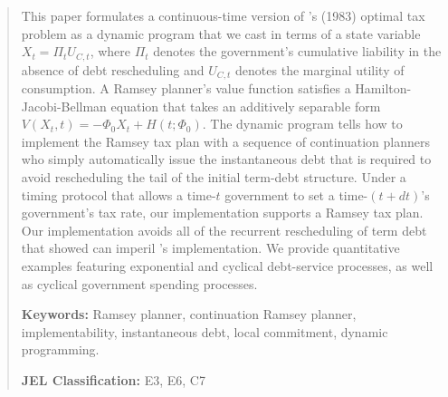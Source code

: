 \documentclass[12pt]{article}
\newcommand{\NW}[1]{{\textcolor{blue}{#1}}}
\newcommand{\TS}[1]{{\textcolor{magenta}{#1}}}
\begin{document}
	\begin{abstract}
		This paper formulates a  continuous-time version of \citeauthor{LucasStokey1983}'s (1983) optimal tax problem as   a dynamic program that we  cast in terms of a state variable $X_t = \Pi_t U_{C,t}$, where $\Pi_t$ denotes the government's cumulative liability {in the absence of debt rescheduling} and $U_{C,t}$ denotes the marginal utility of consumption. A Ramsey planner's value function satisfies a Hamilton-Jacobi-Bellman equation that takes an additively separable form $V(X_t,t) = -\Phi_0 X_t + H(t;\Phi_0)$. 
		{The  dynamic program tells how to   implement  the Ramsey tax  plan with a sequence of continuation planners who  simply automatically %
		  issue the  instantaneous debt that  is required to avoid rescheduling the tail of the initial term-debt structure.} {Under a timing protocol that allows a time-$t$ government to set a time-$(t +dt)$'s government's tax rate,} 
		  our implementation supports a Ramsey tax plan. %
		  Our implementation avoids all of the  %
recurrent  rescheduling of term debt that \cite*{debortoli2021optimal} showed can  imperil \citeauthor{LucasStokey1983}'s implementation. We provide quantitative examples featuring exponential and cyclical debt-service processes, as well as cyclical government spending processes. %
%	
%	
%

		\medskip
		
		\noindent\textbf{Keywords:} Ramsey planner, continuation Ramsey planner, implementability, instantaneous debt, local commitment, dynamic programming.
		
		\medskip
		\noindent\textbf{JEL Classification:} E3, E6, C7
	\end{abstract}
\end{document}
